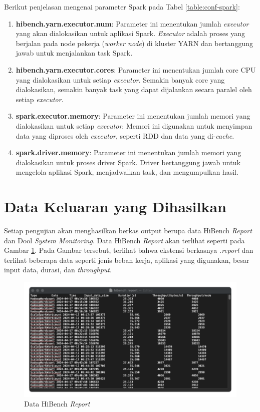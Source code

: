 Berikut penjelasan mengenai parameter Spark pada Tabel \ref{table:conf-spark}:
\begin{enumerate}
	\item \textbf{hibench.yarn.executor.num}: Parameter ini menentukan jumlah \textit{executor} yang akan dialokasikan untuk aplikasi Spark. \textit{Executor} adalah proses yang berjalan pada node pekerja (\textit{worker node}) di kluster YARN dan bertanggung jawab untuk menjalankan task Spark.
	\item \textbf{hibench.yarn.executor.cores}: Parameter ini menentukan jumlah core CPU yang dialokasikan untuk setiap \textit{executor}. Semakin banyak core yang dialokasikan, semakin banyak task yang dapat dijalankan secara paralel oleh setiap \textit{executor}.
	\item \textbf{spark.executor.memory}: Parameter ini menentukan jumlah memori yang dialokasikan untuk setiap \textit{executor}. Memori ini digunakan untuk menyimpan data yang diproses oleh \textit{executor}, seperti RDD dan data yang di-\textit{cache}.
	\item \textbf{spark.driver.memory}: Parameter ini menentukan jumlah memori yang dialokasikan untuk proses driver Spark. Driver bertanggung jawab untuk mengelola aplikasi Spark, menjadwalkan task, dan mengumpulkan hasil.
\end{enumerate}

\section{Data Keluaran yang Dihasilkan}

Setiap pengujian akan menghasilkan berkas output berupa data HiBench \textit{Report} dan Dool \textit{System Monitoring}. Data HiBench \textit{Report} akan terlihat seperti pada Gambar \ref{fig:data-hibench-report}. Pada Gambar tersebut, terlihat bahwa ekstensi berkasnya \textit{.report} dan terlihat beberapa data seperti jenis beban kerja, aplikasi yang digunakan, besar input data, durasi, dan \textit{throughput}.

\begin{figure}[h]
    \centering
    \includegraphics[width=1\textwidth]{figures/ch04/data-hibench}
    \caption{Data HiBench \textit{Report}}
    \label{fig:data-hibench-report}
\end{figure}

